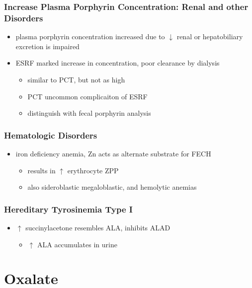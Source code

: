 \documentclass[12pt]{scrartcl}
\begin{document}
\subsubsection{Increase Plasma Porphyrin Concentration: Renal and other Disorders}
\label{sec:orgd3bc8d4}
\begin{itemize}
\item plasma porphyrin concentration increased due to \(\downarrow\) renal or
hepatobiliary excretion is impaired
\item ESRF marked increase in concentration, poor clearance by dialysis
\begin{itemize}
\item similar to PCT, but not as high
\item PCT uncommon complicaiton of ESRF
\item distinguish with fecal porphyrin analysis
\end{itemize}
\end{itemize}
\subsubsection{Hematologic Disorders}
\label{sec:orgbaf2bad}
\begin{itemize}
\item iron deficiency anemia, Zn acts as alternate substrate for FECH
\begin{itemize}
\item results in \(\uparrow\) erythrocyte ZPP
\item also sideroblastic megaloblastic, and hemolytic anemias
\end{itemize}
\end{itemize}
\subsubsection{Hereditary Tyrosinemia Type I}
\label{sec:orgf975dae}
\begin{itemize}
\item \(\uparrow\) succinylacetone resembles ALA, inhibits ALAD
\begin{itemize}
\item \(\uparrow\) ALA accumulates in urine
\end{itemize}
\end{itemize}
\section{Oxalate}
\label{sec:org1841d4e}
\end{document}

